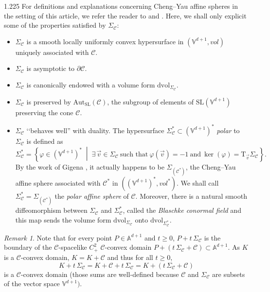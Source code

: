 \documentclass[reqno, a4paper]{amsart}
\numberwithin{equation}{section}
\numberwithin{figure}{section}
\theoremstyle{definition}
\theoremstyle{remark}
\newtheorem{remark}[theorem]{Remark}
\newcommand{\V}{\mathbb{V}} %
\newcommand{\A}{\mathbb{A}} %
\newcommand{\SL}{\mathrm{SL}} %
\newcommand{\dif}{\mathrm{d}} %
\newcommand{\C}{\mathcal{C}} %
\renewcommand{\S}{\Sigma_\C} %
\newcommand{\linvol}{\mathit{vol}} %
\newcommand{\dvol}{\dif \mathrm{vol}} %
\newcommand{\st}{\; \middle\vert \;} %
\begin{document}
\begin{spacing}{1.225}
For definitions and explanations concerning Cheng--Yau affine spheres in the setting of this article, we refer the reader to \cite{Loftin_10} and \cite{Ablondi_25}. Here, we shall only explicit some of the properties satisfied by $\S$:
\begin{itemize}
 \item $\S$ is a smooth locally uniformly convex hypersurface in $(\V^{d+1},\linvol)$ uniquely associated with $\C$.
 \item $\S$ is asymptotic to $\partial \C$.
 \item $\S$ is canonically endowed with a volume form $\dvol_{\S}$.
 \item $\S$ is preserved by $\mathrm{Aut}_{\SL}(\C)$, the subgroup of elements of $\SL(\V^{d+1})$ preserving the cone $\C$. 
 \item $\S$ ‘‘behaves well'' with duality. The hypersurface $\S^* \subset (\V^{d+1})^*$ \emph{polar} to $\S$ is defined as 
 \begin{equation*}
 \S^* = \left\lbrace \varphi \in (\V^{d+1})^* \st \exists \, \vec{v} \in \S \ \text{such that} \ \varphi(\vec{v}) = -1 \ \text{and} \ \ker(\varphi)=\mathrm{T}_{\vec{v}}\S\right\rbrace . 
 \end{equation*}
 By the work of Gigena \cite[Proposition~1]{Gigena_81}, it actually happens to be $\Sigma_{(\C^*)}$, the Cheng--Yau affine sphere associated with $\C^*$ in $((\V^{d+1})^*,\linvol^*)$. We shall call $\S^* = \Sigma_{(\C^*)}$ the \emph{polar affine sphere} of $\C$. Moreover, there is a natural smooth diffeomorphism between $\S$ and $\S^*$, called the \emph{Blaschke conormal field} and this map sends the volume form $\dvol_{\S}$ onto $\dvol_{\S^*}$.
\end{itemize}

\begin{remark}
\label{rem K+S}
Note that for every point $P \in \A^{d+1}$ and $t\geq 0$, $P + t\, \S$ is the boundary of the $\C$-spacelike $C^2_+$ $\C$-convex domain $P+ (t\, \S + \C) \subset \A^{d+1}$. As $K$ is a $\C$-convex domain, $K = K +\C$ and thus for all $t \geq 0$,
\begin{equation*}
 K+t\, \S = K+ \C + t\, \S = K+ (t\, \S + \C)
\end{equation*}
is a $\C$-convex domain (those sums are well-defined because $\C$ and $\S$ are subsets of the vector space $\V^{d+1})$.   
\end{remark}


\end{spacing}
\end{document}
